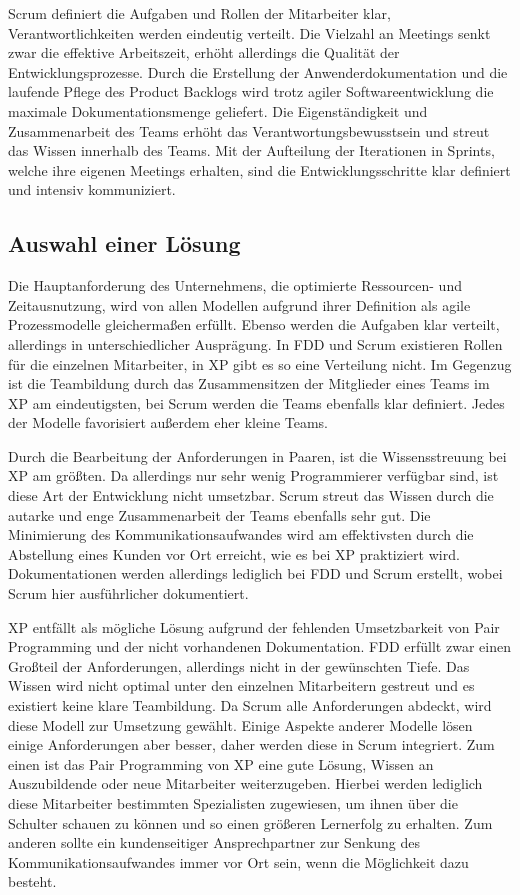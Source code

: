 Scrum definiert die Aufgaben und Rollen der Mitarbeiter klar, Verantwortlichkeiten werden eindeutig verteilt. Die Vielzahl an Meetings senkt zwar die effektive Arbeitszeit, erhöht allerdings die Qualität der Entwicklungsprozesse. Durch die Erstellung der Anwenderdokumentation und die laufende Pflege des Product Backlogs wird trotz agiler Softwareentwicklung die maximale Dokumentationsmenge geliefert. Die Eigenständigkeit und Zusammenarbeit des Teams erhöht das Verantwortungsbewusstsein und streut das Wissen innerhalb des Teams. Mit der Aufteilung der Iterationen in Sprints, welche ihre eigenen Meetings erhalten, sind die Entwicklungsschritte klar definiert und intensiv kommuniziert.

\subsection{Auswahl einer Lösung}
Die Hauptanforderung des Unternehmens, die optimierte Ressourcen- und Zeitausnutzung, wird von allen Modellen aufgrund ihrer Definition als agile Prozessmodelle gleichermaßen erfüllt. Ebenso werden die Aufgaben klar verteilt, allerdings in unterschiedlicher Ausprägung. In FDD und Scrum existieren Rollen für die einzelnen Mitarbeiter, in XP gibt es so eine Verteilung nicht. Im Gegenzug ist die Teambildung durch das Zusammensitzen der Mitglieder eines Teams im XP am eindeutigsten, bei Scrum werden die Teams ebenfalls klar definiert. Jedes der Modelle favorisiert außerdem eher kleine Teams.

Durch die Bearbeitung der Anforderungen in Paaren, ist die Wissensstreuung bei XP am größten. Da allerdings nur sehr wenig Programmierer verfügbar sind, ist diese Art der Entwicklung nicht umsetzbar. Scrum streut das Wissen durch die autarke und enge Zusammenarbeit der Teams ebenfalls sehr gut. Die Minimierung des Kommunikationsaufwandes wird am effektivsten durch die Abstellung eines Kunden vor Ort erreicht, wie es bei XP praktiziert wird. Dokumentationen werden allerdings lediglich bei FDD und Scrum erstellt, wobei Scrum hier ausführlicher dokumentiert.

XP entfällt als mögliche Lösung aufgrund der fehlenden Umsetzbarkeit von Pair Programming und der nicht vorhandenen Dokumentation. FDD erfüllt zwar einen Großteil der Anforderungen, allerdings nicht in der gewünschten Tiefe. Das Wissen wird nicht optimal unter den einzelnen Mitarbeitern gestreut und es existiert keine klare Teambildung. Da Scrum alle Anforderungen abdeckt, wird diese Modell zur Umsetzung gewählt. Einige Aspekte anderer Modelle lösen einige Anforderungen aber besser, daher werden diese in Scrum integriert. Zum einen ist das Pair Programming von XP eine gute Lösung, Wissen an Auszubildende oder neue Mitarbeiter weiterzugeben. Hierbei werden lediglich diese Mitarbeiter bestimmten Spezialisten zugewiesen, um ihnen über die Schulter schauen zu können und so einen größeren Lernerfolg zu erhalten. Zum anderen sollte ein kundenseitiger Ansprechpartner zur Senkung des Kommunikationsaufwandes immer vor Ort sein, wenn die Möglichkeit dazu besteht.